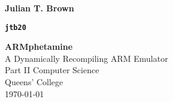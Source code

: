 \addtolength{\topmargin}{-1cm}
\addtolength{\textwidth}{2cm}

\hfill{\LARGE \bf Julian T. Brown}

\hfill{\Large \bf {\tt jtb20}}

\addtolength{\textwidth}{-2cm}
\addtolength{\topmargin}{1cm}

\vspace*{60mm}
\begin{center}
\Huge
{\bf ARMphetamine} \\
\Large
A Dynamically Recompiling ARM Emulator\\
\Huge
\vspace*{5mm}
Part II Computer Science \\
\vspace*{5mm}
Queens' College \\
\vspace*{5mm}
\today  %
\end{center}
